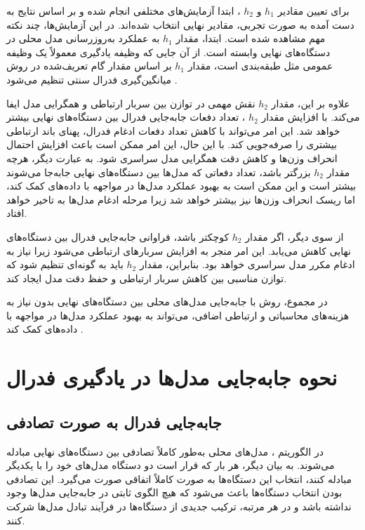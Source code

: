 برای تعیین مقادیر
$h_1$
و
$h_2$%
، ابتدا آزمایش‌های مختلفی انجام شده و بر اساس نتایج به دست آمده به صورت تجربی، مقادیر نهایی انتخاب شده‌اند. در این آزمایش‌ها، چند نکته مهم مشاهده شده است. ابتدا، مقدار
$h_1$
به عملکرد به‌روزرسانی مدل محلی در دستگاه‌های نهایی وابسته است. از آن‌ جایی که وظیفه یادگیری معمولاً یک وظیفه عمومی مثل طبقه‌بندی است، مقدار
$h_1$
بر اساس مقدار گام تعریف‌شده در روش میانگین‌گیری فدرال سنتی تنظیم می‌شود
\cite{chiu2020semisupervised}.

علاوه بر این، مقدار
$h_2$
نقش مهمی در توازن بین سربار ارتباطی و همگرایی مدل ایفا می‌کند. با افزایش مقدار
$h_2$%
، تعداد دفعات جابه‌جایی فدرال بین دستگاه‌های نهایی بیشتر خواهد شد. این امر می‌تواند با کاهش تعداد دفعات ادغام فدرال، پهنای باند ارتباطی بیشتری را صرفه‌جویی کند. با این حال، این امر ممکن است باعث افزایش احتمال انحراف وزن‌ها و کاهش دقت همگرایی مدل سراسری شود. به عبارت دیگر، هرچه مقدار
$h_2$
بزرگتر باشد، تعداد دفعاتی که مدل‌ها بین دستگاه‌های نهایی جابه‌جا می‌شوند بیشتر است و این ممکن است به بهبود عملکرد مدل‌ها در مواجهه با داده‌های
کمک کند، اما ریسک انحراف وزن‌ها نیز بیشتر خواهد شد زیرا مرحله ادغام مدل‌ها به تاخیر خواهد افتاد.

از سوی دیگر، اگر مقدار
$h_2$
کوچکتر باشد، فراوانی جابه‌جایی فدرال بین دستگاه‌های نهایی کاهش می‌یابد. این امر منجر به افزایش سربارهای ارتباطی می‌شود زیرا نیاز به ادغام مکرر مدل سراسری خواهد بود. بنابراین، مقدار
$h_2$
باید به گونه‌ای تنظیم شود که توازن مناسبی بین کاهش سربار ارتباطی و حفظ دقت مدل ایجاد کند.

در مجموع، روش
با جابه‌جایی مدل‌های محلی بین دستگاه‌های نهایی بدون نیاز به هزینه‌های محاسباتی و ارتباطی اضافی، می‌تواند به بهبود عملکرد مدل‌ها در مواجهه با داده‌های
کمک کند
\cite{chiu2020semisupervised}.



\section{نحوه جابه‌جایی مدل‌ها در یادگیری فدرال}
\subsection{جابه‌جایی فدرال به صورت تصادفی}

در الگوریتم
%
، مدل‌های محلی به‌طور کاملاً تصادفی بین دستگاه‌های نهایی مبادله می‌شوند. به بیان دیگر، هر بار که قرار است دو دستگاه مدل‌های خود را با یکدیگر مبادله کنند، انتخاب این دستگاه‌ها به صورت کاملاً اتفاقی صورت می‌گیرد. این تصادفی بودن انتخاب دستگاه‌ها باعث می‌شود که هیچ الگوی ثابتی در جابه‌جایی مدل‌ها وجود نداشته باشد و در هر مرتبه، ترکیب جدیدی از دستگاه‌ها در فرآیند تبادل مدل‌ها شرکت کنند.


